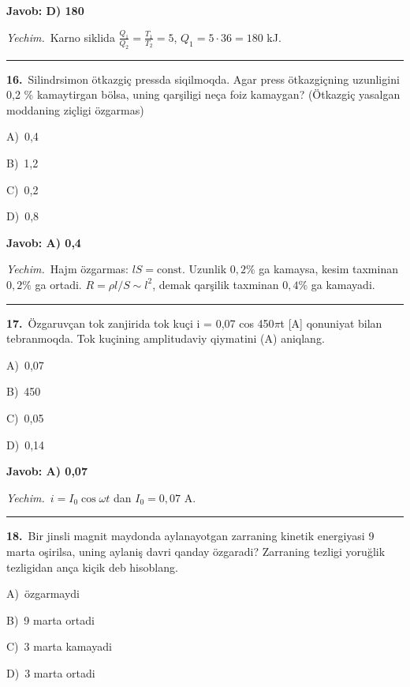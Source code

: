 \documentclass[11pt,a4paper]{article}
\newcommand{\opt}[2]{\hspace*{4mm}#1)\ #2\par}
\begin{document}
\noindent\colorbox{gray!12}{\parbox{\dimexpr\linewidth-2\fboxsep}{\textbf{Javob: D) 180}}}\par\smallskip
\noindent\textit{Yechim.}\ Karno siklida $\frac{Q_1}{Q_2}=\frac{T_1}{T_2}=5$, $Q_1=5\cdot36=180$ kJ.\par\par\medskip\hrule\medskip
{}\noindent\begin{minipage}{\linewidth}
\textbf{16.}\ Silindrsimon ötkazgiç pressda siqilmoqda. Agar press ötkazgiçning uzunligini 0,2 \% kamaytirgan bölsa, uning qarşiligi neça foiz kamaygan? (Ötkazgiç yasalgan moddaning ziçligi özgarmas)\par\smallskip
\opt{A}{0,4}
\opt{B}{1,2}
\opt{C}{0,2}
\opt{D}{0,8}
\end{minipage}\vspace{2pt}\par
\noindent\colorbox{gray!12}{\parbox{\dimexpr\linewidth-2\fboxsep}{\textbf{Javob: A) 0,4}}}\par\smallskip
\noindent\textit{Yechim.}\ Hajm özgarmas: $lS=\text{const}$. Uzunlik $0{,}2\%$ ga kamaysa, kesim taxminan $0{,}2\%$ ga ortadi. $R=\rho l/S\sim l^2$, demak qarşilik taxminan $0{,}4\%$ ga kamayadi.\par\par\medskip\hrule\medskip
{}\noindent\begin{minipage}{\linewidth}
\textbf{17.}\ Özgaruvçan tok zanjirida tok kuçi i = 0,07 cos 450$\pi$t [A] qonuniyat bilan tebranmoqda. Tok kuçining amplitudaviy qiymatini (A) aniqlang.\par\smallskip
\opt{A}{0,07}
\opt{B}{450}
\opt{C}{0,05}
\opt{D}{0,14}
\end{minipage}\vspace{2pt}\par
\noindent\colorbox{gray!12}{\parbox{\dimexpr\linewidth-2\fboxsep}{\textbf{Javob: A) 0,07}}}\par\smallskip
\noindent\textit{Yechim.}\ $i=I_0\cos\omega t$ dan $I_0=0{,}07$ A.\par\par\medskip\hrule\medskip
{}\noindent\begin{minipage}{\linewidth}
\textbf{18.}\ Bir jinsli magnit maydonda aylanayotgan zarraning kinetik energiyasi 9 marta oşirilsa, uning aylaniş davri qanday özgaradi? Zarraning tezligi yoruğlik tezligidan ança kiçik deb hisoblang.\par\smallskip
\opt{A}{özgarmaydi}
\opt{B}{9 marta ortadi}
\opt{C}{3 marta kamayadi}
\opt{D}{3 marta ortadi}
\end{minipage}\vspace{2pt}\par
\end{document}
